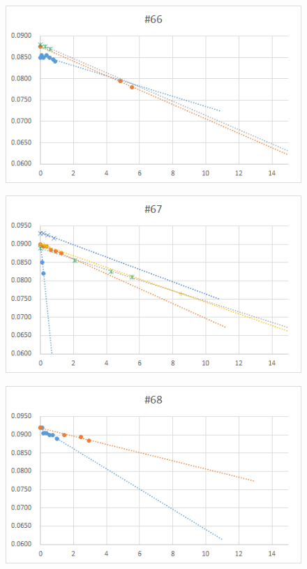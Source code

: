 \documentclass[12pt,a4paper]{jarticle}
\begin{document}
\begin{figure}[htbp]
  \centering
     \includegraphics[width=120mm]{vol_066.png}
\end{figure}
\begin{figure}[htbp]
  \centering
     \includegraphics[width=120mm]{vol_067.png}
\end{figure}
\begin{figure}[htbp]
  \centering
     \includegraphics[width=120mm]{vol_068.png}
\end{figure}
\newpage
\end{document}
